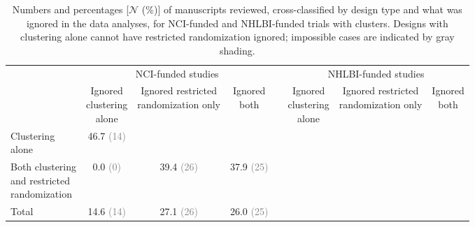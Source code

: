 \documentclass{article}
\newcommand{\pctN}[2]{#1 {\textcolor{gray}{(#2)}}}
\begin{document}
\begin{landscape}
\begin{table}[p]
\large\rmfamily\centering
\captionsetup{width=9in, font=large, labelfont=normalfont, textfont=normalfont}
\caption{Numbers and percentages [$\mathcal{N}$ (\%)] of manuscripts reviewed, cross-classified by design type and what was ignored in the data analyses, for NCI-funded and NHLBI-funded trials with clusters. Designs with clustering alone cannot have restricted randomization ignored; impossible cases are indicated by gray shading.}
\label{tab:IgnoredData}
\setlength{\tabcolsep}{8pt}
\begin{tabular}{l ccc p{18pt} ccc}
\toprule
& \multicolumn{3}{c}{NCI-funded studies} & & \multicolumn{3}{c}{NHLBI-funded studies} \\
\cmidrule(lr){2-4}\cmidrule(lr){6-8}
& \makecell[t]{Ignored\\clustering\\alone}
& \makecell[t]{Ignored restricted\\randomization only}
& \makecell[t]{Ignored\\both}
&
& \makecell[t]{Ignored\\clustering\\alone}
& \makecell[t]{Ignored restricted\\randomization only}
& \makecell[t]{Ignored\\both} \\
\midrule
\shortstack[l]{Clustering\\alone}
  & \pctN{46.7}{14} & \cellcolor[gray]{0.85} & \cellcolor[gray]{0.85}
  & & & \cellcolor[gray]{0.85} & \cellcolor[gray]{0.85} \\[10pt]
\shortstack[l]{Both clustering\\and restricted\\randomization}
  & \pctN{0.0}{0} & \pctN{39.4}{26} & \pctN{37.9}{25}
  & & & & \\[10pt]
Total
  & \pctN{14.6}{14} & \pctN{27.1}{26} & \pctN{26.0}{25}
  & & & & \\
\bottomrule
\end{tabular}
\end{table}
\end{landscape}

\clearpage
\end{document}
